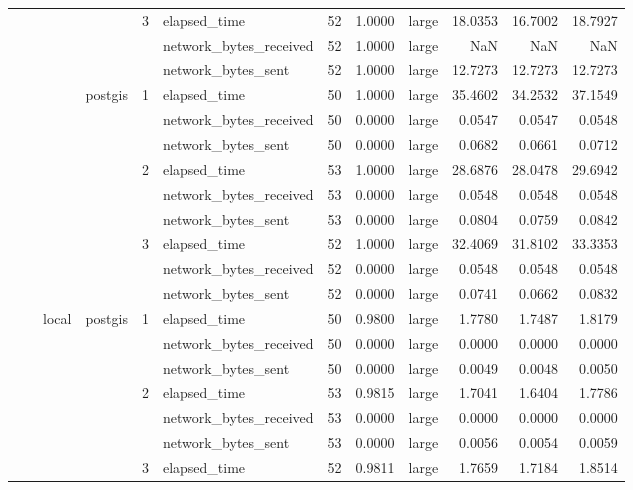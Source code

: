 \begin{tabular}{llllllrrlrrr}
\cline{5-12}
 &  &  &  & \multirow[t]{3}{*}{3} & elapsed_time & 52 & 1.0000 & large & 18.0353 & 16.7002 & 18.7927 \\
 &  &  &  &  & network_bytes_received & 52 & 1.0000 & large & NaN & NaN & NaN \\
 &  &  &  &  & network_bytes_sent & 52 & 1.0000 & large & 12.7273 & 12.7273 & 12.7273 \\
\cline{4-12} \cline{5-12}
 &  &  & \multirow[t]{9}{*}{postgis} & \multirow[t]{3}{*}{1} & elapsed_time & 50 & 1.0000 & large & 35.4602 & 34.2532 & 37.1549 \\
 &  &  &  &  & network_bytes_received & 50 & 0.0000 & large & 0.0547 & 0.0547 & 0.0548 \\
 &  &  &  &  & network_bytes_sent & 50 & 0.0000 & large & 0.0682 & 0.0661 & 0.0712 \\
\cline{5-12}
 &  &  &  & \multirow[t]{3}{*}{2} & elapsed_time & 53 & 1.0000 & large & 28.6876 & 28.0478 & 29.6942 \\
 &  &  &  &  & network_bytes_received & 53 & 0.0000 & large & 0.0548 & 0.0548 & 0.0548 \\
 &  &  &  &  & network_bytes_sent & 53 & 0.0000 & large & 0.0804 & 0.0759 & 0.0842 \\
\cline{5-12}
 &  &  &  & \multirow[t]{3}{*}{3} & elapsed_time & 52 & 1.0000 & large & 32.4069 & 31.8102 & 33.3353 \\
 &  &  &  &  & network_bytes_received & 52 & 0.0000 & large & 0.0548 & 0.0548 & 0.0548 \\
 &  &  &  &  & network_bytes_sent & 52 & 0.0000 & large & 0.0741 & 0.0662 & 0.0832 \\
\cline{3-12} \cline{4-12} \cline{5-12}
 &  & \multirow[t]{9}{*}{local} & \multirow[t]{9}{*}{postgis} & \multirow[t]{3}{*}{1} & elapsed_time & 50 & 0.9800 & large & 1.7780 & 1.7487 & 1.8179 \\
 &  &  &  &  & network_bytes_received & 50 & 0.0000 & large & 0.0000 & 0.0000 & 0.0000 \\
 &  &  &  &  & network_bytes_sent & 50 & 0.0000 & large & 0.0049 & 0.0048 & 0.0050 \\
\cline{5-12}
 &  &  &  & \multirow[t]{3}{*}{2} & elapsed_time & 53 & 0.9815 & large & 1.7041 & 1.6404 & 1.7786 \\
 &  &  &  &  & network_bytes_received & 53 & 0.0000 & large & 0.0000 & 0.0000 & 0.0000 \\
 &  &  &  &  & network_bytes_sent & 53 & 0.0000 & large & 0.0056 & 0.0054 & 0.0059 \\
\cline{5-12}
 &  &  &  & \multirow[t]{3}{*}{3} & elapsed_time & 52 & 0.9811 & large & 1.7659 & 1.7184 & 1.8514 \\

\end{tabular}
